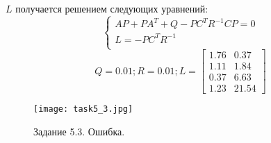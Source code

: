 \(L\) получается решением следующих уравнений:
\[
\begin{cases}
    A P + P A^T + Q - PC^TR^{-1}CP = 0\\
    L = -P C^T R^{-1}\\
\end{cases}
\]
\[Q = 0.01; R = 0.01; L = \begin{bmatrix}
    1.76 &  0.37\\
    1.11 &  1.84\\
    0.37 &  6.63\\
    1.23 &  21.54
  \end{bmatrix}\]
\begin{figure}[]
        \centering
        \texttt{[image: task5\_3.jpg]}
        \caption{Задание 5.3. Ошибка.}
        \label{fig:task5_3}
\end{figure}



